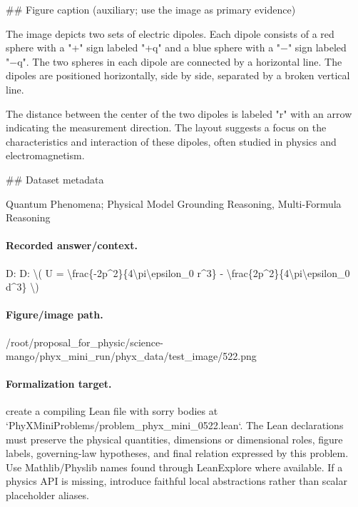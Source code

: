 \#\# Figure caption (auxiliary; use the image as primary evidence)

The image depicts two sets of electric dipoles. Each dipole consists of a red sphere with a "+" sign labeled "+q" and a blue sphere with a "−" sign labeled "−q". The two spheres in each dipole are connected by a horizontal line. The dipoles are positioned horizontally, side by side, separated by a broken vertical line.

The distance between the center of the two dipoles is labeled "r" with an arrow indicating the measurement direction. The layout suggests a focus on the characteristics and interaction of these dipoles, often studied in physics and electromagnetism.

\#\# Dataset metadata

Quantum Phenomena; Physical Model Grounding Reasoning, Multi-Formula Reasoning

\paragraph{Recorded answer/context.}
D: D: \textbackslash{}( U = \textbackslash{}frac\{-2p\textasciicircum{}2\}\{4\textbackslash{}pi\textbackslash{}epsilon\_0 r\textasciicircum{}3\} - \textbackslash{}frac\{2p\textasciicircum{}2\}\{4\textbackslash{}pi\textbackslash{}epsilon\_0 d\textasciicircum{}3\} \textbackslash{})

\paragraph{Figure/image path.}
/root/proposal\_for\_physic/science-mango/phyx\_mini\_run/phyx\_data/test\_image/522.png

\paragraph{Formalization target.}
create a compiling Lean file with sorry bodies at `PhyXMiniProblems/problem\_phyx\_mini\_0522.lean`. The Lean declarations must preserve the physical quantities, dimensions or dimensional roles, figure labels, governing-law hypotheses, and final relation expressed by this problem.
Use Mathlib/Physlib names found through LeanExplore where available. If a physics API is missing, introduce faithful local abstractions rather than scalar placeholder aliases.

